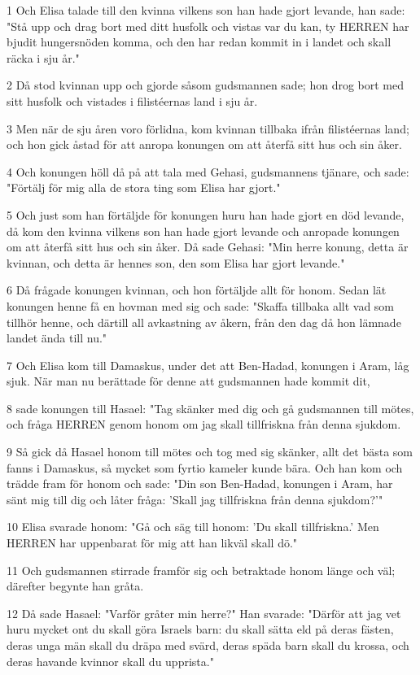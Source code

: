 \par 1 Och Elisa talade till den kvinna vilkens son han hade gjort levande, han sade: "Stå upp och drag bort med ditt husfolk och vistas var du kan, ty HERREN har bjudit hungersnöden komma, och den har redan kommit in i landet och skall räcka i sju år."
\par 2 Då stod kvinnan upp och gjorde såsom gudsmannen sade; hon drog bort med sitt husfolk och vistades i filistéernas land i sju år.
\par 3 Men när de sju åren voro förlidna, kom kvinnan tillbaka ifrån filistéernas land; och hon gick åstad för att anropa konungen om att återfå sitt hus och sin åker.
\par 4 Och konungen höll då på att tala med Gehasi, gudsmannens tjänare, och sade: "Förtälj för mig alla de stora ting som Elisa har gjort."
\par 5 Och just som han förtäljde för konungen huru han hade gjort en död levande, då kom den kvinna vilkens son han hade gjort levande och anropade konungen om att återfå sitt hus och sin åker. Då sade Gehasi: "Min herre konung, detta är kvinnan, och detta är hennes son, den som Elisa har gjort levande."
\par 6 Då frågade konungen kvinnan, och hon förtäljde allt för honom. Sedan lät konungen henne få en hovman med sig och sade: "Skaffa tillbaka allt vad som tillhör henne, och därtill all avkastning av åkern, från den dag då hon lämnade landet ända till nu."
\par 7 Och Elisa kom till Damaskus, under det att Ben-Hadad, konungen i Aram, låg sjuk. När man nu berättade för denne att gudsmannen hade kommit dit,
\par 8 sade konungen till Hasael: "Tag skänker med dig och gå gudsmannen till mötes, och fråga HERREN genom honom om jag skall tillfriskna från denna sjukdom.
\par 9 Så gick då Hasael honom till mötes och tog med sig skänker, allt det bästa som fanns i Damaskus, så mycket som fyrtio kameler kunde bära. Och han kom och trädde fram för honom och sade: "Din son Ben-Hadad, konungen i Aram, har sänt mig till dig och låter fråga: 'Skall jag tillfriskna från denna sjukdom?'"
\par 10 Elisa svarade honom: "Gå och säg till honom: 'Du skall tillfriskna.' Men HERREN har uppenbarat för mig att han likväl skall dö."
\par 11 Och gudsmannen stirrade framför sig och betraktade honom länge och väl; därefter begynte han gråta.
\par 12 Då sade Hasael: "Varför gråter min herre?" Han svarade: "Därför att jag vet huru mycket ont du skall göra Israels barn: du skall sätta eld på deras fästen, deras unga män skall du dräpa med svärd, deras späda barn skall du krossa, och deras havande kvinnor skall du upprista."
